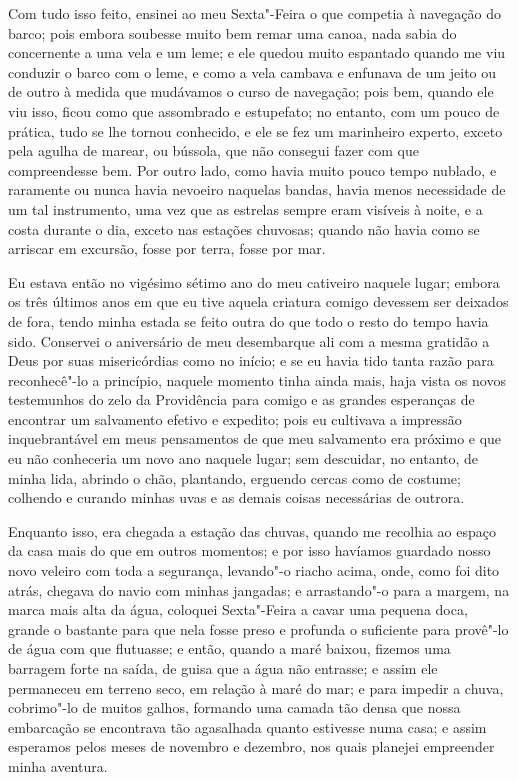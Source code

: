 Com tudo isso feito, ensinei ao meu Sexta"-Feira o que competia à
navegação do barco; pois embora soubesse muito bem remar uma canoa, nada
sabia do concernente a uma vela e um leme; e ele quedou muito espantado
quando me viu conduzir o barco com o leme, e como a vela cambava e
enfunava de um jeito ou de outro à medida que mudávamos o curso de
navegação; pois bem, quando ele viu isso, ficou como que assombrado e
estupefato; no entanto, com um pouco de prática, tudo se lhe tornou
conhecido, e ele se fez um marinheiro experto, exceto pela agulha de
marear, ou bússola, que não consegui fazer com que compreendesse bem.
Por outro lado, como havia muito pouco tempo nublado, e raramente ou
nunca havia nevoeiro naquelas bandas, havia menos necessidade de um tal
instrumento, uma vez que as estrelas sempre eram visíveis à noite, e a
costa durante o dia, exceto nas estações chuvosas; quando não havia como
se arriscar em excursão, fosse por terra, fosse por mar.

Eu estava então no vigésimo sétimo ano do meu cativeiro naquele lugar;
embora os três últimos anos em que eu tive aquela criatura comigo
devessem ser deixados de fora, tendo minha estada se feito outra do que
todo o resto do tempo havia sido. Conservei o aniversário de meu
desembarque ali com a mesma gratidão a Deus por suas misericórdias como
no início; e se eu havia tido tanta razão para reconhecê"-lo a princípio,
naquele momento tinha ainda mais, haja vista os novos testemunhos do
zelo da Providência para comigo e as grandes esperanças de encontrar um
salvamento efetivo e expedito; pois eu cultivava a impressão
inquebrantável em meus pensamentos de que meu salvamento era próximo e
que eu não conheceria um novo ano naquele lugar; sem descuidar, no
entanto, de minha lida, abrindo o chão, plantando, erguendo cercas como
de costume; colhendo e curando minhas uvas e as demais coisas
necessárias de outrora.

Enquanto isso, era chegada a estação das chuvas, quando me recolhia ao
espaço da casa mais do que em outros momentos; e por isso havíamos
guardado nosso novo veleiro com toda a segurança, levando"-o riacho
acima, onde, como foi dito atrás, chegava do navio com minhas jangadas;
e arrastando"-o para a margem, na marca mais alta da água, coloquei
Sexta"-Feira a cavar uma pequena doca, grande o bastante para que nela
fosse preso e profunda o suficiente para provê"-lo de água com que
flutuasse; e então, quando a maré baixou, fizemos uma barragem forte na
saída, de guisa que a água não entrasse; e assim ele permaneceu em
terreno seco, em relação à maré do mar; e para impedir a chuva,
cobrimo"-lo de muitos galhos, formando uma camada tão densa que nossa
embarcação se encontrava tão agasalhada quanto estivesse numa casa; e
assim esperamos pelos meses de novembro e dezembro, nos quais planejei
empreender minha aventura.

